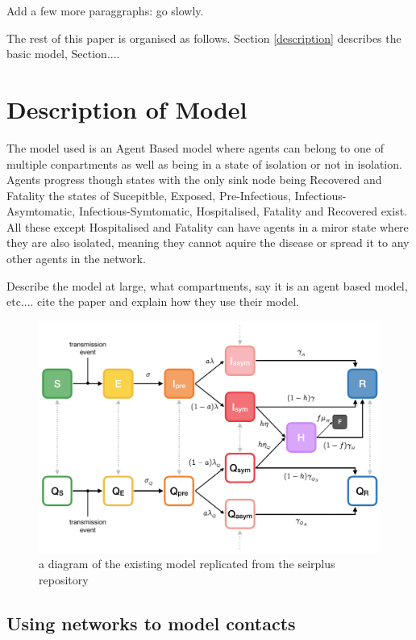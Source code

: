 \documentclass{article}
\begin{document}
Add a few more paraggraphs: go slowly.


The rest of this paper is organised as follows. Section \ref{description} describes the basic model, Section....



\section{Description of Model \label{description}}
The model used is an Agent Based model where agents can belong to one of multiple conpartments as well as being in a state of isolation or not in isolation.
Agents progress though states with the only sink node being Recovered and Fatality
the states of Sucepitble, Exposed, Pre-Infectious, Infectious-Asymtomatic, Infectious-Symtomatic, Hospitalised, Fatality and Recovered exist. All these except Hospitalised and Fatality can have agents in a miror state where they are also isolated, meaning they cannot aquire the disease or spread it to any other agents in the network.

Describe the model at large, what compartments, say it is an agent based model, etc.... cite the paper and explain how they use their model.


\begin{figure}
  \centering
      \includegraphics[width=\textwidth]{ExtSEIRS_compartments_quarantine}
  \caption{a diagram of the existing model replicated from the seirplus repository ~\cite{mcgee_2021}}
\end{figure}

\newpage



\subsection{Using networks to model contacts}
\end{document}
